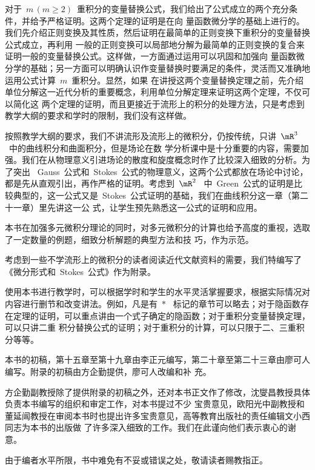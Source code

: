 \begin{preface}
对于~$m\,(m\geq 2)$~重积分的变量替换公式，我们给出了公式成立的两个充分条件，并给予严格证明。这两个定理的证明是在向
量函数微分学的基础上进行的。我们先介绍正则变换及其性质，然后证明在最简单的正则变换下重积分的变量替换公式成立，再利用
一般的正则变换可以局部地分解为最简单的正则变换的复合来证明一般的变量替换公式。这样做，一方面通过运用可以巩固和加强向
量函数微分学的基础；另一方面可以明确认识作变量替换时要满足的条件，灵活而又准确地运用公式计算~$m$~重积分。显然，如果
在讲授这两个变量替换定理之前，先介绍单位分解这一近代分析的重要概念，利用单位分解定理来证明这两个定理，不仅可以简化这
两个定理的证明，而且更接近于流形上的积分的处理方法，只是考虑到教学大纲的要求和学时的限制，我们没有这样做。

按照教学大纲的要求，我们不讲流形及流形上的微积分，仍按传统，只讲~$\mR^3$~中的曲线积分和曲面积分，但是场论在数
学分析课中是十分重要的内容，需要加强。我们在从物理意义引进场论的散度和旋度概念时作了比较深入细致的分析。为了突出
~Gauss~公式和~Stokes~公式的物理意义，这两个公式都放在场论中讨论，都是先从直观引出，再作严格的证明。考虑到~$\mR^2$~
中~Green~公式的证明是比较典型的，这一公式又是~Stokes~公式证明的基础，我们在曲线积分这一章（第二十一章）里先讲这一公
式，让学生预先熟悉这一公式的证明和应用。

本书在加强多元微积分理论的同时，对多元微积分的计算也给予高度的重视，选取了一定数量的例题，细致分析解题的典型方法和技
巧，作为示范。

考虑到一些不学流形上的微积分的读者阅读近代文献资料的需要，我们特编写了《微分形式和~Stokes~公式》作为附录。

使用本书进行教学时，可以根据学时和学生的水平灵活掌握要求，根据实际情况对内容进行删节和改变讲法。例如，凡是有~$\ast$~
标记的章节可以略去；对于隐函数存在定理的证明，可以重点讲由一个式子确定的隐函数；对于重积分变量替换定理，可以只讲二重
积分替换公式的证明；对于重积分的计算，可以只限于二、三重积分等等。

本书的初稿，第十五章至第十九章由李正元编写，第二十章至第二十三章由廖可人编写。附录的初稿由方企勤提供，廖可人改编和补
充。

方企勤副教授除了提供附录的初稿之外，还对本书正文作了修改，沈燮昌教授具体负责本书编写的组织和审定工作，对本书提过不少
宝贵意见，欧阳光中副教授和董延闿教授在审阅本书时也提出许多宝贵意见，高等教育出版社的责任编辑文小西同志为本书的出版做
了许多深入细致的工作。我们在此谨向他们表示衷心的谢意。

由于编者水平所限，书中难免有不妥或错误之处，敬请读者赐教指正。
\end{preface}

\endinput
